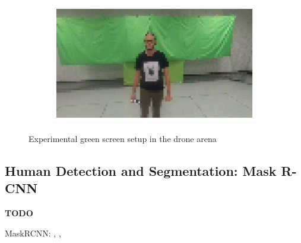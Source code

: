\begin{figure}[!h]
\begin{center}
\begin{subfigure}[h]{0.24\textwidth}
		\end{subfigure}
		\hfill
		\begin{subfigure}[h]{0.24\textwidth}
			\centering
			\includegraphics[width=1\textwidth]{"contents/images/04-greenscreen-4"}
		\end{subfigure}
	\end{center}
	\vspace{-0.5cm}
	\caption[Experimental green screen setup in the drone arena]{Experimental green screen setup in the drone arena}
	\label{fig:greenscreen}
\end{figure}



\subsection{Human Detection and Segmentation: Mask R-CNN}
\label{subsec:sota-maskrcnn}

\textbf{TODO}

MaskRCNN: \cite{he2018mask}, \cite{maskrcnn_explanation}, \cite{maskrcnn_arcgis}






